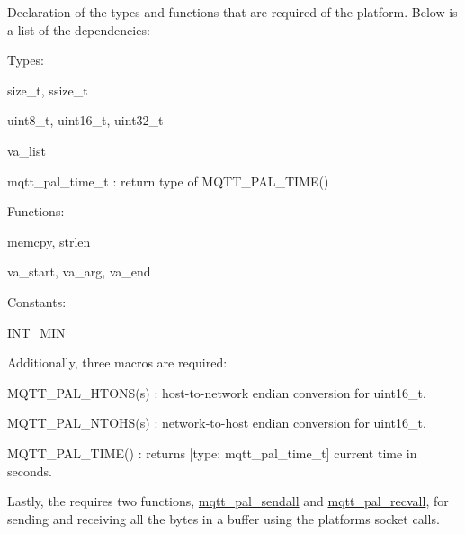 Declaration of the types and functions that are required of the platform. Below is a list of the dependencies\+:
\begin{DoxyItemize}
\item Types\+:
\begin{DoxyItemize}
\item {\ttfamily size\+\_\+t}, {\ttfamily ssize\+\_\+t} 
\item {\ttfamily uint8\+\_\+t}, {\ttfamily uint16\+\_\+t}, {\ttfamily uint32\+\_\+t} 
\item {\ttfamily va\+\_\+list} 
\item {\ttfamily mqtt\+\_\+pal\+\_\+time\+\_\+t} \+: return type of {\ttfamily M\+Q\+T\+T\+\_\+\+P\+A\+L\+\_\+\+T\+I\+M\+E()} 
\end{DoxyItemize}
\item Functions\+:
\begin{DoxyItemize}
\item {\ttfamily memcpy}, {\ttfamily strlen} 
\item {\ttfamily va\+\_\+start}, {\ttfamily va\+\_\+arg}, {\ttfamily va\+\_\+end} 
\end{DoxyItemize}
\item Constants\+:
\begin{DoxyItemize}
\item {\ttfamily I\+N\+T\+\_\+\+M\+IN} 
\end{DoxyItemize}
\end{DoxyItemize}

Additionally, three macro\textquotesingle{}s are required\+:
\begin{DoxyItemize}
\item {\ttfamily M\+Q\+T\+T\+\_\+\+P\+A\+L\+\_\+\+H\+T\+O\+N\+S(s)} \+: host-\/to-\/network endian conversion for uint16\+\_\+t.
\item {\ttfamily M\+Q\+T\+T\+\_\+\+P\+A\+L\+\_\+\+N\+T\+O\+H\+S(s)} \+: network-\/to-\/host endian conversion for uint16\+\_\+t.
\item {\ttfamily M\+Q\+T\+T\+\_\+\+P\+A\+L\+\_\+\+T\+I\+M\+E()} \+: returns \mbox{[}type\+: {\ttfamily mqtt\+\_\+pal\+\_\+time\+\_\+t}\mbox{]} current time in seconds.
\end{DoxyItemize}

Lastly, the requires two functions, \hyperlink{group__pal_gac8dd7d5af889f5933dda733007adb9a3}{mqtt\+\_\+pal\+\_\+sendall} and \hyperlink{group__pal_ga620d6ab20694c9b4d99293a47491004e}{mqtt\+\_\+pal\+\_\+recvall}, for sending and receiving all the bytes in a buffer using the platforms socket calls. 

